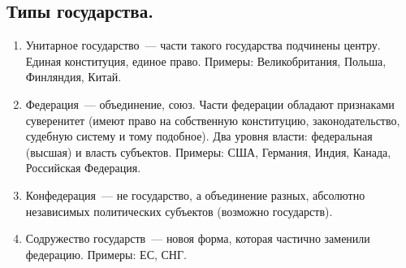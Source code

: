 \documentclass{article}
\begin{document}
	\subsection{Типы государства.}
	\begin{enumerate}
		\item Унитарное государство~--- части такого государства подчинены центру. Единая конституция, единое право. Примеры: Великобритания, Польша, Финляндия, Китай.
		\item Федерация~--- объединение, союз. Части федерации обладают признаками суверенитет (имеют право на собственную конституцию, законодательство, судебную систему и тому подобное). Два уровня власти: федеральная (высшая) и власть субъектов. Примеры: США, Германия, Индия, Канада, Российская Федерация.
		\item Конфедерация~--- не государство, а объединение разных, абсолютно независимых политических субъектов (возможно государств).
		\item Содружество государств~--- новоя форма, которая частично заменили федерацию. Примеры: ЕС, СНГ.
	\end{enumerate}
\end{document}
